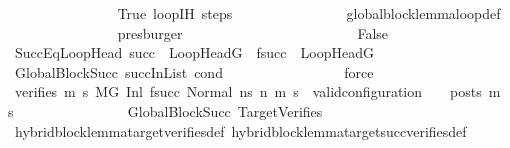 \begin{isabellebody}
\ \ \ \ \ \ \ \ \ \ \ \ \ \ \isamarkupfalse%
\ True\ loopIH\ steps\isanewline
\ \ \ \ \ \ \ \ \ \ \ \ \ \ \isamarkupfalse%
\ global{\isacharunderscore}{\kern0pt}block{\isacharunderscore}{\kern0pt}lemma{\isacharunderscore}{\kern0pt}loop{\isacharunderscore}{\kern0pt}def\isanewline
\ \ \ \ \ \ \ \ \ \ \ \ \ \ \isamarkupfalse%
\ presburger\isanewline
\ \ \ \ \ \ \ \ \ \ \isamarkupfalse%
\isanewline
\ \ \ \ \ \ \ \ \ \ \ \ \isamarkupfalse%
\ False\isanewline
\ \ \ \ \ \ \ \ \ \ \ \ \isamarkupfalse%
\ SuccEqLoopHead{\isacharcolon}{\kern0pt}\ {\isachardoublequoteopen}succ\ {\isacharequal}{\kern0pt}\ LoopHeadG\ {\isasymand}\ f{\isacharparenleft}{\kern0pt}succ{\isacharparenright}{\kern0pt}\ {\isacharequal}{\kern0pt}\ LoopHeadG{\isacharprime}{\kern0pt}{\isachardoublequoteclose}\isanewline
\ \ \ \ \ \ \ \ \ \ \ \ \ \ \isamarkupfalse%
\ GlobalBlockSucc\ succInList\ cond\ \isanewline
\ \ \ \ \ \ \ \ \ \ \ \ \ \ \isamarkupfalse%
\ force\isanewline
\ \ \isanewline
\ \ \ \ \ \ \ \ \ \ \ \ \isamarkupfalse%
\ verifies{\isacharcolon}{\kern0pt}\ {\isachardoublequoteopen}{\isasymforall}m{}{\isacharprime}{\kern0pt}\ s{}{\isacharprime}{\kern0pt}{\isachardot}{\kern0pt}{\isacharparenleft}{\kern0pt}\ M{\isacharcomma}{\kern0pt}{\isasymLambda}{\isacharcomma}{\kern0pt}{\isasymGamma}{\isacharcomma}{\kern0pt}{\isasymOmega}{\isacharcomma}{\kern0pt}G{\isacharprime}{\kern0pt}\ {\isasymturnstile}{\isacharparenleft}{\kern0pt}Inl\ {\isacharparenleft}{\kern0pt}f{\isacharparenleft}{\kern0pt}succ{\isacharparenright}{\kern0pt}{\isacharparenright}{\kern0pt}{\isacharcomma}{\kern0pt}\ Normal\ ns{\isacharprime}{\kern0pt}{\isacharparenright}{\kern0pt}\ {\isacharminus}{\kern0pt}n{\isasymrightarrow}{\isacharasterisk}{\kern0pt}\ {\isacharparenleft}{\kern0pt}m{}{\isacharprime}{\kern0pt}{\isacharcomma}{\kern0pt}\ s{}{\isacharprime}{\kern0pt}{\isacharparenright}{\kern0pt}{\isacharparenright}{\kern0pt}\ {\isasymlongrightarrow}\ valid{\isacharunderscore}{\kern0pt}configuration\ {\isasymLambda}\ {\isasymGamma}\ {\isasymOmega}\ posts\ m{}{\isacharprime}{\kern0pt}\ s{}{\isacharprime}{\kern0pt}{\isachardoublequoteclose}\isanewline
\ \ \ \ \ \ \ \ \ \ \ \ \ \ \isamarkupfalse%
\ GlobalBlockSucc\ TargetVerifies\isanewline
\ \ \ \ \ \ \ \ \ \ \ \ \ \ \isamarkupfalse%
\ hybrid{\isacharunderscore}{\kern0pt}block{\isacharunderscore}{\kern0pt}lemma{\isacharunderscore}{\kern0pt}target{\isacharunderscore}{\kern0pt}verifies{\isacharunderscore}{\kern0pt}def\ hybrid{\isacharunderscore}{\kern0pt}block{\isacharunderscore}{\kern0pt}lemma{\isacharunderscore}{\kern0pt}target{\isacharunderscore}{\kern0pt}succ{\isacharunderscore}{\kern0pt}verifies{\isacharunderscore}{\kern0pt}def\isanewline

\end{isabellebody}
